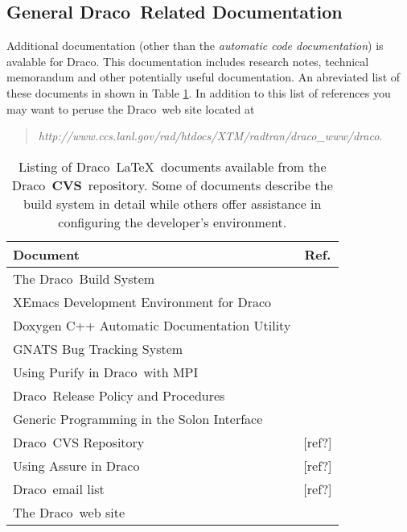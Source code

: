 \documentclass[11pt]{nmemo}
\newcommand{\draco}{{\normalfont\sffamily Draco}}
\newcommand{\cvs}{{\normalfont\bfseries CVS}}
\begin{document}
\subsection{General \draco\ Related Documentation}

Additional documentation (other than the \emph{automatic code
documentation}) is avalable for \draco.  This documentation includes
research notes, technical memorandum and other potentially useful
documentation.  An abreviated list of these documents in shown in
Table \ref{tab:draco_docs}.  In addition to this list of references
you may want to peruse the \draco\ web site located at

\begin{quote}
\emph{http://www.ccs.lanl.gov/rad/htdocs/XTM/radtran/draco\_www/draco}.
\end{quote}

\begin{table}
  \caption{Listing of \draco\ \LaTeX\ documents available from the
    \draco\ \cvs\ repository.  Some of documents describe the build
    system in detail while others offer assistance in configuring the
    developer's environment.}
  \label{tab:draco_docs}
  \begin{center}
    \begin{tabular}{lc} \hline\hline
      \multicolumn{1}{l}{Document} & \multicolumn{1}{c}{Ref.} \\ \hline
      The \draco\ Build System               & ~\cite{draco-build} \\
      XEmacs Development Environment for \draco & ~\cite{xtm:9909} \\
      Doxygen C++ Automatic Documentation Utility & ~\cite{doxygen} \\
      GNATS Bug Tracking System              & ~\cite{draco-gnats} \\
      Using Purify in \draco\ with MPI       & ~\cite{draco-purify} \\
      \draco\ Release Policy and Procedures  & ~\cite{xtm:9936}    \\
      Generic Programming in the Solon Interface & ~\cite{ro98} \\
      \draco\ CVS Repository                 & [ref?] \\
      Using Assure in \draco                 & [ref?] \\
      \draco\ email list                     & [ref?] \\
      The \draco\ web site                   &  ~\cite{draco-web-site} \\
      \hline\hline
    \end{tabular}
  \end{center}
\end{table}
\end{document}
